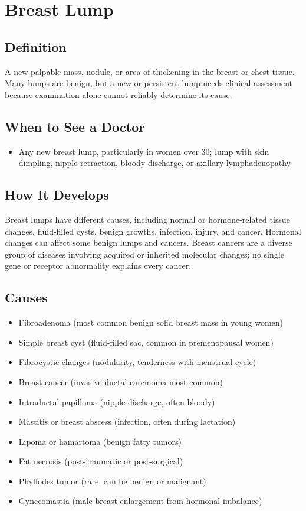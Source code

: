 \chapter{Breast Lump}

\section*{Definition}
A new palpable mass, nodule, or area of thickening in the breast or chest tissue. Many lumps are benign, but a new or persistent lump needs clinical assessment because examination alone cannot reliably determine its cause.

\section*{When to See a Doctor}

\begin{itemize}
 \item Any new breast lump, particularly in women over 30; lump with skin dimpling, nipple retraction, bloody discharge, or axillary lymphadenopathy
\end{itemize}

\section*{How It Develops}
Breast lumps have different causes, including normal or hormone-related tissue changes, fluid-filled cysts, benign growths, infection, injury, and cancer. Hormonal changes can affect some benign lumps and cancers. Breast cancers are a diverse group of diseases involving acquired or inherited molecular changes; no single gene or receptor abnormality explains every cancer.

\section*{Causes}
\begin{itemize}
 \item Fibroadenoma (most common benign solid breast mass in young women)
 \item Simple breast cyst (fluid-filled sac, common in premenopausal women)
 \item Fibrocystic changes (nodularity, tenderness with menstrual cycle)
 \item Breast cancer (invasive ductal carcinoma most common)
 \item Intraductal papilloma (nipple discharge, often bloody)
 \item Mastitis or breast abscess (infection, often during lactation)
 \item Lipoma or hamartoma (benign fatty tumors)
 \item Fat necrosis (post-traumatic or post-surgical)
 \item Phyllodes tumor (rare, can be benign or malignant)
 \item Gynecomastia (male breast enlargement from hormonal imbalance)
\end{itemize}

